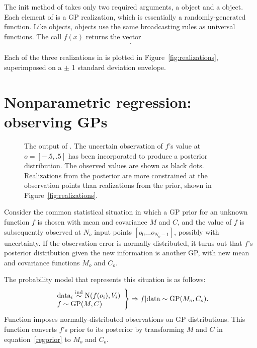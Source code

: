 \documentclass[article]{jss}
\begin{document}
The init method of  takes only two required arguments, a  object and a  object. Each element of  is a GP realization, which is essentially a randomly-generated  function. Like  objects,  objects use the same broadcasting rules as  universal functions. The call $f(x)$ returns the vector
\begin{eqnarray*}
    [f(x_0)\ldots f(x_{N_x-1})].
\end{eqnarray*}

Each of the three realizations in  is plotted in Figure~\ref{fig:realizations}, superimposed on a $\pm$ 1 standard deviation envelope.


\section{Nonparametric regression: observing GPs}\label{sec:observing}

\begin{figure}
    \centering
    \caption{The output of . The uncertain observation of $f$'s value at $o=[-.5,.5]$ has been incorporated to produce a posterior distribution. The observed values are shown as black dots. Realizations from the posterior are more constrained at the observation points than realizations from the prior, shown in Figure~\ref{fig:realizations}.}
    \label{fig:obs}
\end{figure}

Consider the common statistical situation in which a GP prior for an unknown function $f$ is chosen with mean and covariance $M$ and $C$, and the value of $f$ is subsequently observed at $N_o$ input points $[o_0\ldots o_{N_o-1}]$, possibly with uncertainty. If the observation error is normally distributed, it turns out that $f$'s posterior distribution given the new information is another GP, with new mean and covariance functions $M_o$ and $C_o$.

The probability model that represents this situation is as follows:
\begin{equation}
    \label{regprior}
    \left.\begin{array}{l}
        \textup{data}_i \stackrel{\tiny{\textup{ind}}}{\sim} \textup{N}(f(o_i), V_i)\\
        f \sim \textup{GP}(M,C)\\
    \end{array}\right\}\Rightarrow f|\textup{data} \sim \textup{GP}(M_o, C_o).
\end{equation}
Function  imposes normally-distributed observations on GP distributions. This function converts $f$'s prior to its posterior by transforming $M$ and $C$ in equation~\ref{regprior} to $M_o$ and $C_o$.
\end{document}
